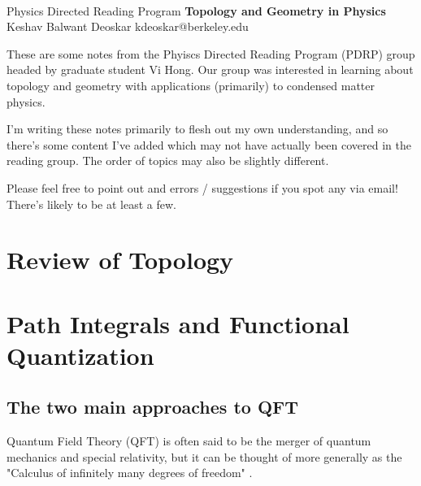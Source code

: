 \documentclass[11pt]{article}
\begin{document}
\thispagestyle{empty}
\bigskip \
\vspace{0.1cm}

\begin{center}
{\fontsize{22}{22} \selectfont Physics Directed Reading Program}
\vskip 16pt
{\fontsize{36}{36} \selectfont \bf \sffamily Topology and Geometry in Physics}
\vskip 24pt
{\fontsize{18}{18} \selectfont \rmfamily Keshav Balwant Deoskar} 
\vskip 6pt
{\fontsize{14}{14} \selectfont \ttfamily kdeoskar@berkeley.edu} 
\vskip 24pt
\end{center}



These are some notes from the Phyiscs Directed Reading Program (PDRP) group headed by graduate student Vi Hong. Our group was interested in learning about topology and geometry with applications (primarily) to condensed matter physics.   

\vskip 0.5cm
I'm writing these notes primarily to flesh out my own understanding, and so there's some content I've added which may not have actually been covered in the reading group. The order of topics may also be slightly different.

\vskip 0.5cm
\begin{redbox}
    Please feel free to point out and errors / suggestions if you spot any via email! There's likely to be at least a few. 
\end{redbox}

\tableofcontents 


\newpage
\section{Review of Topology}
\vskip 0.5cm


\newpage
\section{Path Integrals and Functional Quantization}
\vskip 0.5cm

\subsection{The two main approaches to QFT}
Quantum Field Theory (QFT) is often said to be the merger of quantum mechanics and special relativity, but it can be thought of more generally as the "Calculus of infinitely many degrees of freedom" \cite{232AdiscussionNotes}. 
\end{document}

